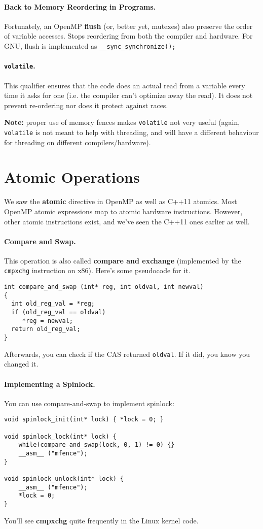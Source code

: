 \paragraph{Back to Memory Reordering in Programs.}
    Fortunately, an OpenMP {\bf flush} (or, better yet, mutexes) also preserve the order of variable accesses.
    Stops reordering from both the compiler and hardware.
    For GNU, flush is implemented as
      {\tt \_\_sync\_synchronize();}

\paragraph{{\tt volatile}.} This qualifier ensures that the
code does an actual read from a variable every time it asks for one
(i.e. the compiler can't optimize away the read). It does not prevent
re-ordering nor does it protect against races.

{\bf Note:} proper use of memory fences makes {\tt volatile} not very
useful (again, {\tt volatile} is not meant to help with threading, and
will have a different behaviour for threading on different
compilers/hardware).

\section*{Atomic Operations}
 We saw the {\bf atomic} directive in OpenMP as well as C++11 atomics. Most OpenMP atomic expressions map to atomic hardware instructions.
However, other atomic instructions exist, and we've seen the C++11 ones earlier as well.

\paragraph{Compare and Swap.} This operation is also called {\bf compare and exchange} (implemented by the {\tt cmpxchg} instruction on x86).
Here's some pseudocode for it.
  \begin{verbatim}
int compare_and_swap (int* reg, int oldval, int newval) 
{
  int old_reg_val = *reg;
  if (old_reg_val == oldval) 
     *reg = newval;
  return old_reg_val;
}
  \end{verbatim}

Afterwards, you can check if the CAS returned {\tt oldval}. If it did, you know you changed it.


\paragraph{Implementing a Spinlock.}
You can use compare-and-swap to implement spinlock:
  \begin{verbatim}
void spinlock_init(int* lock) { *lock = 0; }

void spinlock_lock(int* lock) {
    while(compare_and_swap(lock, 0, 1) != 0) {}
    __asm__ ("mfence");
}

void spinlock_unlock(int* lock) {
    __asm__ ("mfence");
    *lock = 0;  
}
  \end{verbatim}
You'll see {\bf cmpxchg} quite frequently in the Linux kernel code.


